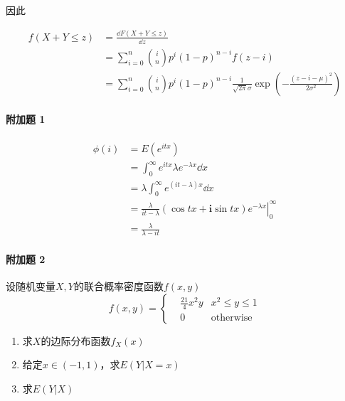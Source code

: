 \documentclass{article}
\begin{document}
    因此

    \begin{equation}
        \begin{aligned}
            f(X + Y\leq z) &= \frac{\dd F(X + Y\leq z)}{\dd z} \\
            &= \sum_{i=0}^n \binom{i}{n}p^{i}(1-p)^{n-i} f(z - i) \\
            &= \sum_{i=0}^n \binom{i}{n}p^{i}(1-p)^{n-i} \frac{1}{\sqrt{2\pi}\sigma}\exp\left(-\frac{(z-i-\mu)^2}{2\sigma^2}\right)
        \end{aligned}
    \end{equation}

    \paragraph*{附加题 1}

    \begin{equation}
        \begin{aligned}
            \phi(i) &= E(e^{itx}) \\
            &= \int_0^\infty e^{itx}\lambda e^{-\lambda x}\dd x \\
            &= \lambda\int_0^\infty e^{(it - \lambda)x}\dd x \\
            &= \frac{\lambda}{it-\lambda}(\cos tx + \mathbf{i}\sin tx)\left.e^{-\lambda x}\right|^\infty_0 \\
            &= \frac{\lambda}{\lambda - it}
        \end{aligned}
    \end{equation}

    \paragraph*{附加题 2}
    设随机变量$X, Y$的联合概率密度函数$f(x, y)$
    \begin{equation}
        f(x, y) = \left\{
        \begin{aligned}
            &\frac{21}{4}x^2y & x^2\leq y\leq 1 \\
            &0 &\mathrm{otherwise}
        \end{aligned}
        \right.
    \end{equation}
    \begin{enumerate}
        \item 求$X$的边际分布函数$f_X(x)$
        \item 给定$x\in (-1, 1)$，求$E(Y|X=x)$
        \item 求$E(Y|X)$
    \end{enumerate}
\end{document}
